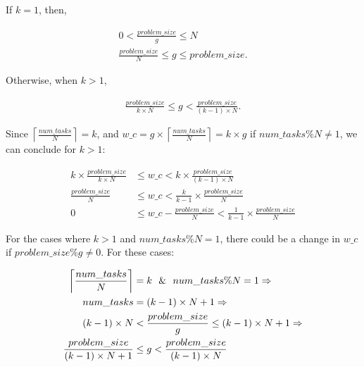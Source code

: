 If $k=1$, then, 

\begin{equation}\label{formula9}
\begin{aligned}
0<\frac{problem\_{size}}{g}\leq{N}\\
\frac{problem\_{size}}{N}\leq{g}\leq{problem\_{size}}.
\end{aligned}
\end{equation}

Otherwise, when $k>1$,

\begin{equation}\label{formula10}
\begin{aligned}
\frac{problem\_{size}}{k\times{N}}\leq{g}<\frac{problem\_{size}}{(k-1)\times{N}}.
\end{aligned}
\end{equation}

Since $\left \lceil{\frac{num\_{tasks}}{N}}\right \rceil=k$, and $w\_c={g\times\left \lceil{\frac{num\_{tasks}}{N}}\right \rceil}={k\times{g}}$ if $num\_{tasks}\%{N}\neq{1}$, we can conclude for $k>1$:

\begin{equation}\label{formula11}
\begin{aligned}
k\times{\frac{problem\_{size}}{k\times{N}}}&\leq{w\_c}<{k\times{\frac{problem\_{size}}{(k-1)\times{N}}}}\\
\frac{problem\_{size}}{{N}}&\leq{w\_c}<{\frac{k}{k-1}\times{\frac{problem\_{size}}{N}}}\\
0&\leq{w\_c-\frac{problem\_{size}}{N}}<\frac{1}{k-1}\times{\frac{problem\_{size}}{N}}
\end{aligned}
\end{equation}

For the cases where $k>1$ and $num\_{tasks}\%{N}={1}$, there could be a  change in $w\_c$ if $problem\_{size}\%{g}\neq{0}$. For these cases:


\begin{equation}\label{formula15}
\begin{aligned}
\left \lceil{\frac{num\_{tasks}}{N}}\right \rceil&=k \text{\:\:\:}\&\text{\:\:\:} num\_{tasks}\%{N}={1}\Rightarrow\\
num\_{tasks}&=(k-1)\times{N}+1\Rightarrow\\
(k-1)\times{N}&<{\frac{problem\_{size}}{g}}\leq(k-1)\times{N}+1\Rightarrow\\
\frac{problem\_{size}}{(k-1)\times{N}+1}&\leq{g}<\frac{problem\_{size}}{(k-1)\times{N}}
\end{aligned}
\end{equation}

